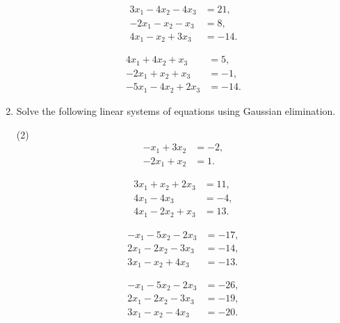 \documentclass[a4paper,11pt]{article}
\begin{document}
\begin{enumerate}[label=2.\arabic*]
\begin{tasks}
        \task 
        \begin{align*}
            3 x_{1} - 4 x_{2} - 4 x_{3} &= 21, \\
            - 2 x_{1} -  x_{2} -  x_{3} &= 8, \\
            4 x_{1} -  x_{2} + 3 x_{3} &= -14.
       \end{align*}

       \task
       \begin{align*}
            4 x_{1} + 4 x_{2} +  x_{3} &= 5, \\
            - 2 x_{1} +  x_{2} +  x_{3} &= -1, \\
            - 5 x_{1} - 4 x_{2} + 2 x_{3} &= -14.
        \end{align*}
    \end{tasks}

    \item Solve the following linear systems of equations using Gaussian elimination.
    \begin{tasks}(2)
        \task 
        \begin{align*}
            - x_{1} + 3 x_{2} &= -2, \\
            - 2 x_{1} +  x_{2} &= 1.
       \end{align*}

       \task \begin{align*}
            3 x_{1} +  x_{2} + 2 x_{3} &= 11, \\
            4 x_{1} - 4 x_{3} &= -4, \\
            4 x_{1} - 2 x_{2} +  x_{3} &= 13.
        \end{align*} 

        \task 
        \begin{align*}
             - x_{1} - 5 x_{2} - 2 x_{3} &= -17, \\
             2 x_{1} - 2 x_{2} - 3 x_{3} &= -14, \\
             3 x_{1} -  x_{2} + 4 x_{3} &= -13.
        \end{align*}

        \task
        \begin{align*}
             - x_{1} - 5 x_{2} - 2 x_{3} &= -26, \\
             2 x_{1} - 2 x_{2} - 3 x_{3} &= -19, \\
             3 x_{1} -  x_{2} - 4 x_{3} &= -20.
        \end{align*}
    \end{tasks}


\end{enumerate}
\end{document}
